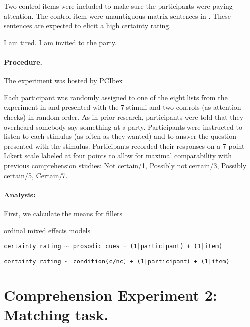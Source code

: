 \documentclass[dina4,12pt,fleqn]{article}
\newcommand{\6}{\mbox{$[\hspace*{-.6mm}[$}}
\newcommand{\9}{\mbox{$]\hspace*{-.6mm}]$}}
\begin{document}
Two control items were included to make sure the participants were paying attention. The control item were unambiguous matrix sentences in \label{controlsExp1}. These sentences are expected to elicit a high certainty rating.

\begin{exe}
\ex\label{controlsExp1} 
\begin{xlist}
\ex I am tired.
\ex I am invited to the party.
\end{xlist}
\end{exe}

\paragraph{Procedure.} The experiment was hosted by PCIbex \citealt{zehr-schwarz-2018}

Each participant was randomly assigned to one of the eight lists from the experiment in and presented with the 7 stimuli  and two controls (as attention checks) in random order. As in prior research, participants were told that they overheard somebody say something at a party. Participants were instructed to listen to each stimulus (as often as they wanted) and to answer the question presented with the stimulus. Participants recorded their responses on a 7-point Likert scale labeled at four points to allow for maximal comparability with previous comprehension studies: Not certain/1, Possibly not certain/3, Possibly certain/5, Certain/7.



\paragraph{Analysis:} First, we calculate the means for fillers



ordinal mixed effects models

{\tt certainty rating $\sim$ prosodic cues + (1|participant)  + (1|item)}

{\tt certainty rating $\sim$ condition(c/nc) + (1|participant)  + (1|item)}

\section{Comprehension Experiment 2: Matching task.}
\end{document}
